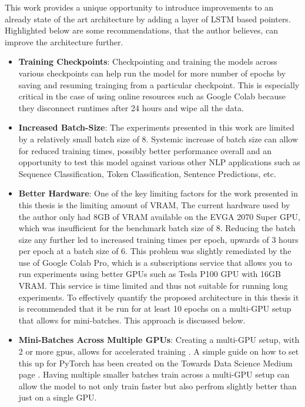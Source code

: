 \documentclass[a4paper,12pt]{report}
\begin{document}
    This work provides a unique opportunity to introduce improvements to an already state of the art architecture by adding a layer of LSTM based pointers. Highlighted below are some recommendations, that the author believes, can improve the architecture further.

    \begin{itemize}

    	\item \textbf{Training Checkpoints}: Checkpointing and training the models across various checkpoints can help run the model for more number of epochs by saving and resuming trainging from a particular checkpoint. This is especially critical in the case of using online resources such as Google Colab because they disconnect runtimes after 24 hours and wipe all the data.

    	\item \textbf{Increased Batch-Size}: The experiments presented in this work are limited by a relatively small batch size of 8. Systemic increase of batch size can allow for reduced training times, possibly better performance overall and an opportunity to test this model against various other NLP applications such as Sequence Classification, Token Classification, Sentence Predictions, etc.

    	\item \textbf{Better Hardware}: One of the key limiting factors for the work presented in this thesis is the limiting amount of VRAM, The current hardware used by the author only had 8GB of VRAM available on the EVGA 2070 Super GPU, which was insufficient for the benchmark batch size of 8. Reducing the batch size any further led to increased training times per epoch, upwards of 3 hours per epoch at a batch size of 6. This problem was slightly remediated by the use of Google Colab Pro, which is a subscriptions service that allows you to run experiments using better GPUs such as Tesla P100 GPU with 16GB VRAM. This service is time limited and thus not suitable for running long experiments. To effectively quantify the proposed architecture in this thesis it is recommended that it be run for at least 10 epochs on a multi-GPU setup that allows for mini-batches. This approach is discussed below.

    	\item \textbf{Mini-Batches Across Multiple GPUs}: Creating a multi-GPU setup, with 2 or more gpus, allows for accelerated training \citep{multigpu1}. A simple guide on how to set this up for PyTorch has been created on the Towards Data Science Medium page \citep{multigpu2}. Having multiple smaller batches train across a multi-GPU setup can allow the model to not only train faster but also perfrom slightly better than just on a single GPU.


\end{itemize}
\end{document}
